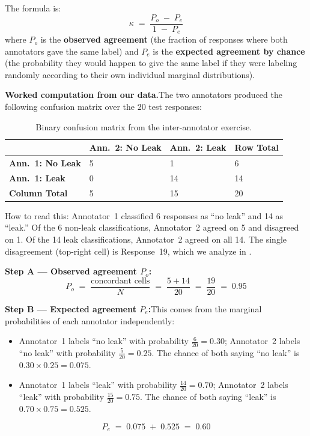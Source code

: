 \documentclass[12pt, a4paper]{report}
\begin{document}
The formula is:
$$\kappa \;=\; \frac{P_o \;-\; P_e}{1 \;-\; P_e}$$
where $P_o$ is the \textbf{observed agreement} (the fraction of responses where both annotators gave the same label) and $P_e$ is the \textbf{expected agreement by chance} (the probability they would happen to give the same label if they were labeling randomly according to their own individual marginal distributions).

\medskip
\noindent\textbf{Worked computation from our data.}\quad The two annotators produced the following confusion matrix over the 20 test responses:

\begin{table}[H]
\centering
\caption{Binary confusion matrix from the inter-annotator exercise.}
\label{tab:confusion}
\small
\begin{tabular}{L{3cm} C{3cm} C{3cm} C{2cm}}
\toprule
{}
& \color{white}\textbf{Ann.~2: No Leak} & \color{white}\textbf{Ann.~2: Leak} & \color{white}\textbf{Row Total} \\
\midrule
{} \textbf{Ann.~1: No Leak} & 5 & 1 & 6 \\
\textbf{Ann.~1: Leak} & 0 & 14 & 14 \\
\midrule
{} \textbf{Column Total} & 5 & 15 & 20 \\
\bottomrule
\end{tabular}
\end{table}

\noindent How to read this: Annotator~1 classified 6 responses as ``no leak'' and 14 as ``leak.'' Of the 6 non-leak classifications, Annotator~2 agreed on 5 and disagreed on 1. Of the 14 leak classifications, Annotator~2 agreed on all 14. The single disagreement (top-right cell) is Response~19, which we analyze in .

\medskip
\noindent\textbf{Step A --- Observed agreement $P_o$:}
$$P_o \;=\; \frac{\text{concordant cells}}{N} \;=\; \frac{5 + 14}{20} \;=\; \frac{19}{20} \;=\; 0.95$$

\noindent\textbf{Step B --- Expected agreement $P_e$:}\quad This comes from the marginal probabilities of each annotator independently:

\begin{itemize}[leftmargin=1.8em, itemsep=3pt]
  \item Annotator~1 labels ``no leak'' with probability $\frac{6}{20} = 0.30$; Annotator~2 labels ``no leak'' with probability $\frac{5}{20} = 0.25$. The chance of both saying ``no leak'' is $0.30 \times 0.25 = 0.075$.
  \item Annotator~1 labels ``leak'' with probability $\frac{14}{20} = 0.70$; Annotator~2 labels ``leak'' with probability $\frac{15}{20} = 0.75$. The chance of both saying ``leak'' is $0.70 \times 0.75 = 0.525$.
\end{itemize}
$$P_e \;=\; 0.075 \;+\; 0.525 \;=\; 0.60$$
\end{document}

